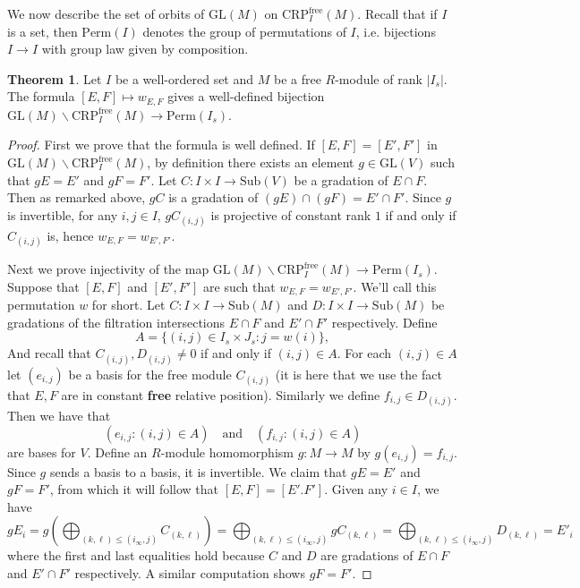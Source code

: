 \documentclass[oneside,11pt]{amsart}
\newcommand{\free}{\ensuremath{\text{free}}}
\newcommand{\CRP}{\ensuremath{\text{CRP}}}
\newcommand{\GL}{\ensuremath{\text{GL}}}
\newcommand{\Sub}{\ensuremath{\text{Sub}}}
\newcommand{\Perm}{\ensuremath{\text{Perm}}}
\theoremstyle{definition}
\newtheorem{proof techniques}{Proof Techniques}
\newtheorem{theorem}{Theorem}
\begin{document}
We now describe the set of orbits of $\GL(M)$ on $\CRP_I^\free(M)$. Recall that if $I$ is a set, then $\Perm(I)$ denotes the group of permutations of $I$, i.e. bijections $I \to I$ with group law given by composition.
 
\begin{theorem}\label{thm: relative position orbits}
Let $I$ be a well-ordered set and $M$ be a free $R$-module of rank $| I_s |$. The formula $[E, F] \mapsto w_{E , F}$ gives a well-defined bijection $\GL(M) \backslash \CRP_I^\free(M) \to \Perm(I_s)$.
\end{theorem}

\begin{proof}
First we prove that the formula is well defined. If $[E , F] = [E', F']$ in $\GL(M) \backslash \CRP_I^\free(M)$, by definition there exists an element $g \in \GL(V)$ such that $gE = E'$ and $gF = F'$. Let $C : I \times I \to \Sub(V)$ be a gradation of $E \cap F$. Then as remarked above,  $gC$ is a gradation of $(gE) \cap (gF) = E' \cap F'$. Since $g$ is invertible, for any $i , j \in I$, $g C_{(i , j)}$ is projective of constant rank $1$ if and only if $C_{(i , j)}$ is, hence $w_{E , F} = w_{E' , F'}$. 

Next we prove injectivity of the map $\GL(M) \backslash \CRP_I^\free(M) \to \Perm(I_s)$. Suppose that $[E , F]$ and $[E', F']$ are such that $w_{E , F} = w_{E' , F'}$. We'll call this permutation $w$ for short. Let $C : I \times I \to \Sub(M)$ and $D : I \times I \to \Sub(M)$ be gradations of the filtration intersections $E \cap F$ and $E' \cap F'$ respectively. Define 
\begin{equation*}
A = \{ (i , j) \in I_s \times J_s : j = w(i) \},
\end{equation*}
And recall that $C_{(i , j)}, D_{(i , j)} \neq 0$ if and only if $(i , j) \in A$. For each $(i , j) \in A$ let $( e_{i , j} )$ be a basis for the free module $C_{(i , j)}$ (it is here that we use the fact that $E, F$ are in constant \textbf{free} relative position). Similarly we define $f_{i , j} \in D_{(i , j)}$. Then we have that 
\begin{equation*}
( e_{i , j} : (i , j ) \in A ) \ \ \ \text{ and } \ \ \ ( f_{i , j} : (i , j ) \in A )
\end{equation*}
are bases for $V$. Define an $R$-module homomorphism $g : M \to M$ by $g(e_{i , j}) = f_{i , j}$. Since $g$ sends a basis to a basis, it is invertible. We claim that $gE = E'$ and $gF = F'$, from which it will follow that $[E , F] = [E'. F']$. Given any $i \in I$, we have 
\begin{equation*}
gE_i  = g \left( \bigoplus_{(k , \ell) \leq (i_\infty , j)} C_{(k , \ell)} \right) = \bigoplus_{(k , \ell) \leq (i_\infty , j)} g C_{(k , \ell)} = \bigoplus_{(k , \ell) \leq (i_\infty , j)} D_{(k , \ell)} = E'_i
\end{equation*}
where the first and last equalities hold because $C$ and $D$ are gradations of $E \cap F$ and $E' \cap F'$ respectively. A similar computation shows $g F = F'$. 


\end{proof}
\end{document}
